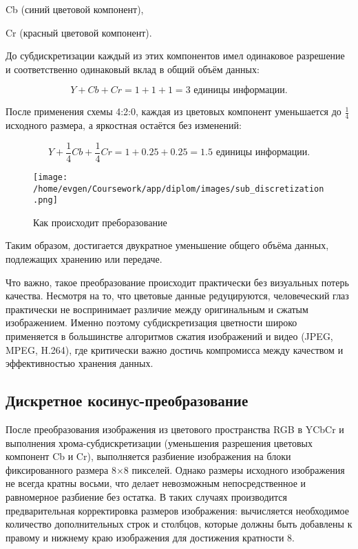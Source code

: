 Cb (синий цветовой компонент),

Cr (красный цветовой компонент).

До субдискретизации каждый из этих компонентов имел одинаковое разрешение и соответственно одинаковый вклад в общий объём данных:


\begin{equation}
    Y + Cb + Cr = 1+1+1=3 \text{ единицы информации}.
\end{equation}

После применения схемы 4:2:0, каждая из цветовых компонент уменьшается до $\frac{1}{4}$ исходного размера, а яркостная остаётся без изменений:

\begin{equation}
    Y + \frac{1}{4}Cb + \frac{1}{4}Cr = 1 + 0.25 + 0.25 = 1.5 \text{ единицы информации}.
\end{equation}

\begin{figure}[H]
    \centering
    \texttt{[image: /home/evgen/Coursework/app/diplom/images/sub\_discretization.png]}
    \caption{Как происходит преборазование}
    \label{fig:sub_dis}
\end{figure}

Таким образом, достигается двукратное уменьшение общего объёма данных, подлежащих хранению или передаче.

Что важно, такое преобразование происходит практически без визуальных потерь качества. 
Несмотря на то, что цветовые данные редуцируются, человеческий глаз практически не воспринимает различие между оригинальным и сжатым изображением. 
Именно поэтому субдискретизация цветности широко применяется в большинстве алгоритмов сжатия изображений и видео (JPEG, MPEG, H.264),
где критически важно достичь компромисса между качеством и эффективностью хранения данных.

\subsection{Дискретное косинус-преобразование}

После преобразования изображения из цветового пространства RGB в YCbCr и выполнения хрома-субдискретизации (уменьшения разрешения цветовых компонент Cb и Cr), 
выполняется разбиение изображения на блоки фиксированного размера 8×8 пикселей. 
Однако размеры исходного изображения не всегда кратны восьми, что делает невозможным непосредственное и равномерное разбиение без остатка. 
В таких случаях производится предварительная корректировка размеров изображения: вычисляется необходимое количество дополнительных строк и столбцов, 
которые должны быть добавлены к правому и нижнему краю изображения для достижения кратности 8.

